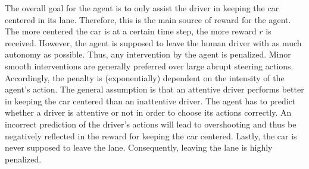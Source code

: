 The overall goal for the agent is to only assist the driver in keeping the car centered in its lane. Therefore, this is the main source of reward for the agent. The more centered the car is at a certain time step, the more reward $r$ is received. However, the agent is supposed to leave the human driver with as much autonomy as possible. Thus, any intervention by the agent is penalized. Minor smooth interventions are generally preferred over large abrupt steering actions. Accordingly, the penalty is (exponentially) dependent on the intensity of the agent's action. The general assumption is that an attentive driver performs better in keeping the car centered than an inattentive driver. The agent has to predict whether a driver is attentive or not in order to choose its actions correctly. An incorrect prediction of the driver's actions will lead to overshooting and thus be negatively reflected in the reward for keeping the car centered. Lastly, the car is never supposed to leave the lane. Consequently, leaving the lane is highly penalized.





